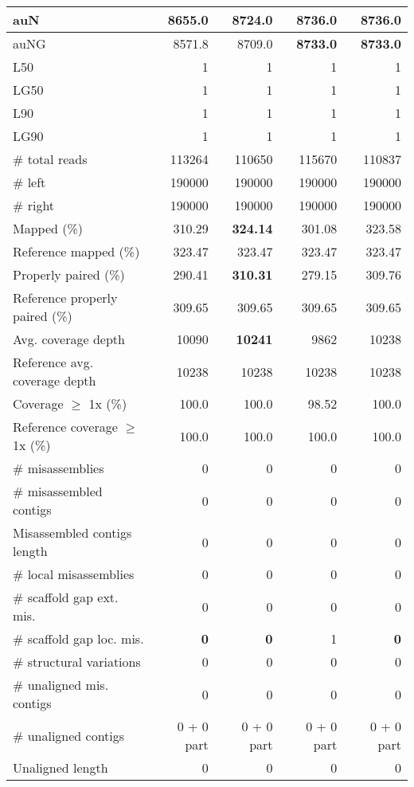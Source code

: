 \documentclass[12pt,a4paper]{article}
\begin{document}
\begin{table}[ht]
\begin{center}
\begin{tabular}{|l*{4}{|r}|}
auN & 8655.0 & 8724.0 & {\bf 8736.0} & {\bf 8736.0} \\ \hline
auNG & 8571.8 & 8709.0 & {\bf 8733.0} & {\bf 8733.0} \\ \hline
L50 & 1 & 1 & 1 & 1 \\ \hline
LG50 & 1 & 1 & 1 & 1 \\ \hline
L90 & 1 & 1 & 1 & 1 \\ \hline
LG90 & 1 & 1 & 1 & 1 \\ \hline
\# total reads & 113264 & 110650 & 115670 & 110837 \\ \hline
\# left & 190000 & 190000 & 190000 & 190000 \\ \hline
\# right & 190000 & 190000 & 190000 & 190000 \\ \hline
Mapped (\%) & 310.29 & {\bf 324.14} & 301.08 & 323.58 \\ \hline
Reference mapped (\%) & 323.47 & 323.47 & 323.47 & 323.47 \\ \hline
Properly paired (\%) & 290.41 & {\bf 310.31} & 279.15 & 309.76 \\ \hline
Reference properly paired (\%) & 309.65 & 309.65 & 309.65 & 309.65 \\ \hline
Avg. coverage depth & 10090 & {\bf 10241} & 9862 & 10238 \\ \hline
Reference avg. coverage depth & 10238 & 10238 & 10238 & 10238 \\ \hline
Coverage $\geq$ 1x (\%) & 100.0 & 100.0 & 98.52 & 100.0 \\ \hline
Reference coverage $\geq$ 1x (\%) & 100.0 & 100.0 & 100.0 & 100.0 \\ \hline
\# misassemblies & 0 & 0 & 0 & 0 \\ \hline
\# misassembled contigs & 0 & 0 & 0 & 0 \\ \hline
Misassembled contigs length & 0 & 0 & 0 & 0 \\ \hline
\# local misassemblies & 0 & 0 & 0 & 0 \\ \hline
\# scaffold gap ext. mis. & 0 & 0 & 0 & 0 \\ \hline
\# scaffold gap loc. mis. & {\bf 0} & {\bf 0} & 1 & {\bf 0} \\ \hline
\# structural variations & 0 & 0 & 0 & 0 \\ \hline
\# unaligned mis. contigs & 0 & 0 & 0 & 0 \\ \hline
\# unaligned contigs & 0 + 0 part & 0 + 0 part & 0 + 0 part & 0 + 0 part \\ \hline
Unaligned length & 0 & 0 & 0 & 0 \\ \hline

\end{tabular}
\end{center}
\end{table}
\end{document}
